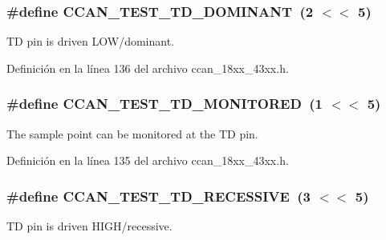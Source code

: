 \subsubsection[{\texorpdfstring{C\+C\+A\+N\+\_\+\+T\+E\+S\+T\+\_\+\+T\+D\+\_\+\+D\+O\+M\+I\+N\+A\+NT}{CCAN_TEST_TD_DOMINANT}}]{\setlength{\rightskip}{0pt plus 5cm}\#define C\+C\+A\+N\+\_\+\+T\+E\+S\+T\+\_\+\+T\+D\+\_\+\+D\+O\+M\+I\+N\+A\+NT~(2 $<$$<$ 5)}\hypertarget{group___c_c_a_n__18_x_x__43_x_x_gacc375f1ade23712882d71808600ad0f2}{}\label{group___c_c_a_n__18_x_x__43_x_x_gacc375f1ade23712882d71808600ad0f2}
TD pin is driven L\+O\+W/dominant. 

Definición en la línea 136 del archivo ccan\+\_\+18xx\+\_\+43xx.\+h.

\subsubsection[{\texorpdfstring{C\+C\+A\+N\+\_\+\+T\+E\+S\+T\+\_\+\+T\+D\+\_\+\+M\+O\+N\+I\+T\+O\+R\+ED}{CCAN_TEST_TD_MONITORED}}]{\setlength{\rightskip}{0pt plus 5cm}\#define C\+C\+A\+N\+\_\+\+T\+E\+S\+T\+\_\+\+T\+D\+\_\+\+M\+O\+N\+I\+T\+O\+R\+ED~(1 $<$$<$ 5)}\hypertarget{group___c_c_a_n__18_x_x__43_x_x_gaab61e1f43219a34dc6dd86a0c1c367b8}{}\label{group___c_c_a_n__18_x_x__43_x_x_gaab61e1f43219a34dc6dd86a0c1c367b8}
The sample point can be monitored at the TD pin. 

Definición en la línea 135 del archivo ccan\+\_\+18xx\+\_\+43xx.\+h.

\subsubsection[{\texorpdfstring{C\+C\+A\+N\+\_\+\+T\+E\+S\+T\+\_\+\+T\+D\+\_\+\+R\+E\+C\+E\+S\+S\+I\+VE}{CCAN_TEST_TD_RECESSIVE}}]{\setlength{\rightskip}{0pt plus 5cm}\#define C\+C\+A\+N\+\_\+\+T\+E\+S\+T\+\_\+\+T\+D\+\_\+\+R\+E\+C\+E\+S\+S\+I\+VE~(3 $<$$<$ 5)}\hypertarget{group___c_c_a_n__18_x_x__43_x_x_gab0d2186b5d8b7936ee151e406422ac1c}{}\label{group___c_c_a_n__18_x_x__43_x_x_gab0d2186b5d8b7936ee151e406422ac1c}
TD pin is driven H\+I\+G\+H/recessive. 

